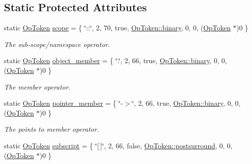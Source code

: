 \subsection*{Static Protected Attributes}
\begin{DoxyCompactItemize}
\item 
static \mbox{\hyperlink{class_op_token}{Op\+Token}} \mbox{\hyperlink{class_print_c_ad83977328e9bfa4f33276563a4306d3e}{scope}} = \{ \char`\"{}\+::\char`\"{}, 2, 70, true, \mbox{\hyperlink{class_op_token_af41c7f108d5662ede7765c5a6c44eaffa3a2ec63522a9329a71ddbe8adc3e752d}{Op\+Token\+::binary}}, 0, 0, (\mbox{\hyperlink{class_op_token}{Op\+Token}} $\ast$)0 \}
\begin{DoxyCompactList}\small\item\em The sub-\/scope/namespace operator. \end{DoxyCompactList}\item 
static \mbox{\hyperlink{class_op_token}{Op\+Token}} \mbox{\hyperlink{class_print_c_acd4bf9c86c5ffd796e010a71bcb697ae}{object\+\_\+member}} = \{ \char`\"{}.\char`\"{}, 2, 66, true, \mbox{\hyperlink{class_op_token_af41c7f108d5662ede7765c5a6c44eaffa3a2ec63522a9329a71ddbe8adc3e752d}{Op\+Token\+::binary}}, 0, 0, (\mbox{\hyperlink{class_op_token}{Op\+Token}} $\ast$)0 \}
\begin{DoxyCompactList}\small\item\em The {\itshape member} operator. \end{DoxyCompactList}\item 
static \mbox{\hyperlink{class_op_token}{Op\+Token}} \mbox{\hyperlink{class_print_c_aaafaaab6d0d2d93fde816c824be3d432}{pointer\+\_\+member}} = \{ \char`\"{}-\/$>$\char`\"{}, 2, 66, true, \mbox{\hyperlink{class_op_token_af41c7f108d5662ede7765c5a6c44eaffa3a2ec63522a9329a71ddbe8adc3e752d}{Op\+Token\+::binary}}, 0, 0, (\mbox{\hyperlink{class_op_token}{Op\+Token}} $\ast$)0 \}
\begin{DoxyCompactList}\small\item\em The {\itshape points} {\itshape to} {\itshape member} operator. \end{DoxyCompactList}\item 
static \mbox{\hyperlink{class_op_token}{Op\+Token}} \mbox{\hyperlink{class_print_c_aff37c9f618ad0e52ae8e117fa950563e}{subscript}} = \{ \char`\"{}\mbox{[}$\,$\mbox{]}\char`\"{}, 2, 66, false, \mbox{\hyperlink{class_op_token_af41c7f108d5662ede7765c5a6c44eaffa82a30068870b08542e958e828d6464fa}{Op\+Token\+::postsurround}}, 0, 0, (\mbox{\hyperlink{class_op_token}{Op\+Token}} $\ast$)0 \}

\end{DoxyCompactItemize}
